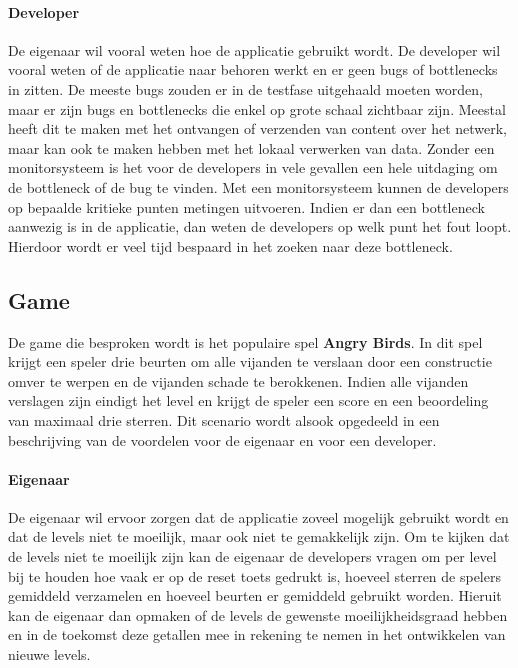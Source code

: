 \paragraph{Developer}
De eigenaar wil vooral weten hoe de applicatie gebruikt wordt. De developer wil vooral weten of de applicatie naar behoren werkt en er geen bugs of bottlenecks in zitten. De meeste bugs zouden er in de testfase uitgehaald moeten worden, maar er zijn bugs en bottlenecks die enkel op grote schaal zichtbaar zijn. Meestal heeft dit te maken met het ontvangen of verzenden van content over het netwerk, maar kan ook te maken hebben met het lokaal verwerken van data. Zonder een monitorsysteem is het voor de developers in vele gevallen een hele uitdaging om de bottleneck of de bug te vinden. Met een monitorsysteem kunnen de developers op bepaalde kritieke punten metingen uitvoeren. Indien er dan een bottleneck aanwezig is in de applicatie, dan weten de developers op welk punt het fout loopt. Hierdoor wordt er veel tijd bespaard in het zoeken naar deze bottleneck. \\



\subsection{Game}
De game die besproken wordt is het populaire spel \textbf{Angry Birds}. In dit spel krijgt een speler drie beurten om alle vijanden te verslaan door een constructie omver te werpen en de vijanden schade te berokkenen. Indien alle vijanden verslagen zijn eindigt het level en krijgt de speler een score en een beoordeling van maximaal drie sterren. Dit scenario wordt alsook opgedeeld in een beschrijving van de voordelen voor de eigenaar en voor een developer.

\paragraph{Eigenaar}
De eigenaar wil ervoor zorgen dat de applicatie zoveel mogelijk gebruikt wordt en dat de levels niet te moeilijk, maar ook niet te gemakkelijk zijn. Om te kijken dat de levels niet te moeilijk zijn kan de eigenaar de developers vragen om per level bij te houden hoe vaak er op de reset toets gedrukt is, hoeveel sterren de spelers gemiddeld verzamelen en hoeveel beurten er gemiddeld gebruikt worden. Hieruit kan de eigenaar dan opmaken of de levels de gewenste moeilijkheidsgraad hebben en in de toekomst deze getallen mee in rekening te nemen in het ontwikkelen van nieuwe levels.

